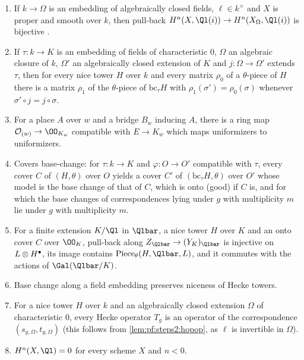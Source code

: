 \begin{proposition}\label{prop:pf:steps2:towerfound}
\begin{enumerate}[label=\textup{(\alph*)},leftmargin=2.2em]
\item If $k\to\Omega$ is an embedding of algebraically closed fields, $\ell\in k^\times$ and $X$ is
  proper and smooth over $k$, then pull-back $H^n(X,\Ql(i))\to H^n(X_\Omega,\Ql(i))$ is bijective
  \cite[Exp.~XVI]{ArtinGrothendieckVerdier1972}.
\item If $\tau\colon k\to K$ is an embedding of fields of characteristic $0$, $\Omega$ an algebraic
  closure of $k$, $\Omega'$ an algebraically closed extension of $K$ and $j\colon\Omega\to\Omega'$
  extends $\tau$, then for every nice tower $H$ over $k$ and every matrix $\rho_0$ of a $\theta$-piece
  of $H$ there is a matrix $\rho_1$ of the $\theta$-piece of $\mathrm{bc}_\tau H$ with
  $\rho_1(\sigma')=\rho_0(\sigma)$ whenever $\sigma'\circ j=j\circ\sigma$.
\item For a place $A$ over $w$ and a bridge $B_w$ inducing $A$, there is a ring map
  $\stepsiiOw\to\OO_{K_w}$ compatible with $E\to K_w$ which maps uniformizers to uniformizers.
\item Covers base-change: for $\tau\colon k\to K$ and $\varphi\colon O\to O'$ compatible with $\tau$,
  every cover $C$ of $(H,\theta)$ over $O$ yields a cover $C'$ of $(\mathrm{bc}_\tau H,\theta)$ over
  $O'$ whose model is the base change of that of $C$, which is onto (good) if $C$ is, and for which
  the base changes of correspondences lying under $g$ with multiplicity $m$ lie under $g$ with
  multiplicity $m$.
\item For a finite extension $K/\Ql$ in $\Qlbar$, a nice tower $H$ over $K$ and an onto cover $C$ over
  $\OO_K$, pull-back along $Z_{\Qlbar}\to(Y_K)_{\Qlbar}$ is injective on $L\otimes H^{\bullet}$, its image
  contains $\stepsiiPiece_\theta(H,\Qlbar,L)$, and it commutes with the actions of $\Gal(\Qlbar/K)$.
\item Base change along a field embedding preserves niceness of Hecke towers.
\item For a nice tower $H$ over $k$ and an algebraically closed extension $\Omega$ of characteristic
  $0$, every Hecke operator $T_g$ is an operator of the correspondence $(s_{g,\Omega},t_{g,\Omega})$
  (this follows from \cref{lem:pf:steps2:hopop}, as $\ell$ is invertible in $\Omega$).
\item $H^n(X,\Ql)=0$ for every scheme $X$ and $n<0$.
\end{enumerate}
\end{proposition}

